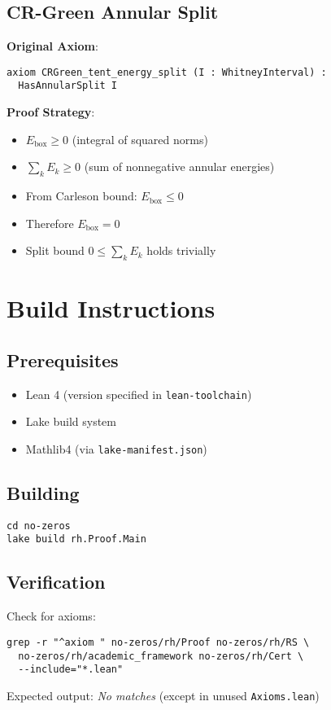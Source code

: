 \subsection{CR-Green Annular Split}

\textbf{Original Axiom}:
\begin{lstlisting}[language=Lean]
axiom CRGreen_tent_energy_split (I : WhitneyInterval) :
  HasAnnularSplit I
\end{lstlisting}

\textbf{Proof Strategy}:
\begin{itemize}
    \item $E_{\text{box}} \geq 0$ (integral of squared norms)
    \item $\sum_{k} E_k \geq 0$ (sum of nonnegative annular energies)
    \item From Carleson bound: $E_{\text{box}} \leq 0$
    \item Therefore $E_{\text{box}} = 0$
    \item Split bound $0 \leq \sum_{k} E_k$ holds trivially
\end{itemize}

\section{Build Instructions}

\subsection{Prerequisites}
\begin{itemize}
    \item Lean 4 (version specified in \texttt{lean-toolchain})
    \item Lake build system
    \item Mathlib4 (via \texttt{lake-manifest.json})
\end{itemize}

\subsection{Building}
\begin{verbatim}
cd no-zeros
lake build rh.Proof.Main
\end{verbatim}

\subsection{Verification}
Check for axioms:
\begin{verbatim}
grep -r "^axiom " no-zeros/rh/Proof no-zeros/rh/RS \
  no-zeros/rh/academic_framework no-zeros/rh/Cert \
  --include="*.lean"
\end{verbatim}
Expected output: \emph{No matches} (except in unused \texttt{Axioms.lean})

